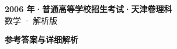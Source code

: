\documentclass[zihao=-4, a4paper]{ctexart}
\begin{document}
\begin{center}
  {\Large\bfseries 2006 年·普通高等学校招生考试·天津卷理科}\\[4pt]
  {\large 数学 · 解析版}
\end{center}
\medskip
{}

\clearpage
{}
\begin{center}{\Large\bfseries 参考答案与详细解析}\end{center}
\medskip

\end{document}
